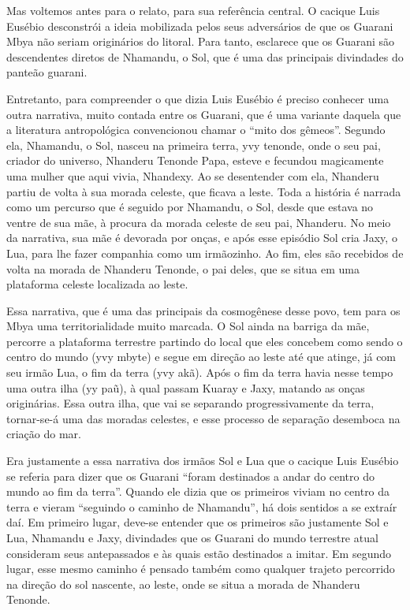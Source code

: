 Mas voltemos antes para o relato, para sua referência central. O cacique
Luis Eusébio desconstrói a ideia mobilizada pelos seus adversários de
que os Guarani Mbya não seriam originários do litoral. Para tanto,
esclarece que os Guarani são descendentes diretos de Nhamandu, o Sol,
que é uma das principais divindades do panteão guarani. 

Entretanto, para compreender o que dizia Luis Eusébio é preciso conhecer
uma outra narrativa, muito contada entre os Guarani, que é uma variante
daquela que a literatura antropológica convencionou chamar o ``mito dos
gêmeos''. Segundo ela, Nhamandu, o Sol, nasceu na primeira terra, yvy
tenonde, onde o seu pai, criador do universo, Nhanderu Tenonde Papa,
esteve e fecundou magicamente uma mulher que aqui vivia, Nhandexy. Ao
se desentender com ela, Nhanderu partiu de volta à sua morada celeste,
que ficava a leste. Toda a história é narrada como um percurso que é
seguido por Nhamandu, o Sol, desde que estava no ventre de sua mãe, à
procura da morada celeste de seu pai, Nhanderu. No meio da narrativa,
sua mãe é devorada por onças, e após esse episódio Sol cria Jaxy, o
Lua, para lhe fazer companhia como um irmãozinho. Ao fim, eles são
recebidos de volta na morada de Nhanderu Tenonde, o pai deles, que se
situa em uma plataforma celeste localizada ao leste.

Essa narrativa, que é uma das principais da cosmogênese desse povo, tem
para os Mbya uma territorialidade muito marcada. O Sol ainda na barriga
da mãe, percorre a plataforma terrestre partindo do local que eles
concebem como sendo o centro do mundo (yvy mbyte) e segue em direção ao
leste até que atinge, já com seu irmão Lua, o fim da terra (yvy akã).
Após o fim da terra havia nesse tempo uma outra ilha (yy paũ), à qual
passam Kuaray e Jaxy, matando as onças originárias. Essa outra ilha,
que vai se separando progressivamente da terra, tornar-se-á uma das
moradas celestes, e esse processo de separação desemboca na criação do
mar. 

Era justamente a essa narrativa dos irmãos Sol e Lua que o cacique Luis
Eusébio se referia para dizer  que os Guarani ``foram destinados a andar
do centro do mundo ao fim da terra''. Quando ele dizia que os primeiros
viviam no centro da terra e vieram ``seguindo o caminho de Nhamandu'', há
dois sentidos a se extraír daí. Em primeiro lugar, deve-se entender que
os primeiros são justamente Sol e Lua, Nhamandu e Jaxy, divindades que
os Guarani do mundo terrestre atual consideram seus antepassados e às
quais estão destinados a imitar. Em segundo lugar, esse mesmo caminho é
pensado também como qualquer trajeto percorrido na direção do sol
nascente, ao leste, onde se situa a morada de Nhanderu Tenonde.

